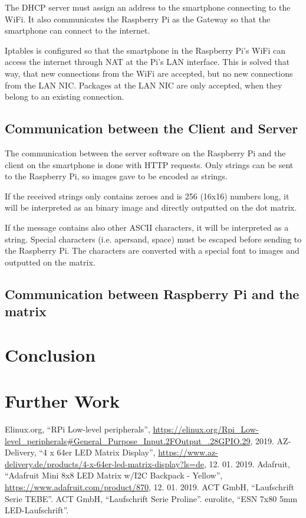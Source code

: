 \documentclass[conference]{IEEEtran}
\begin{document}
The DHCP server must assign an address to the smartphone connecting to the WiFi. It also communicates the Raspberry Pi as the Gateway so that the smartphone can connect to the internet.

Iptables is configured so that the smartphone in the Raspberry Pi's WiFi can access the internet through NAT at the Pi's LAN interface. This is solved that way, that new connections from the WiFi are accepted, but no new connections from the LAN NIC. Packages at the LAN NIC are only accepted, when they belong to an existing connection.

\subsection{Communication between the Client and Server}
The communication between the server software on the Raspberry Pi and the client on the smartphone is done with HTTP requests. Only strings can be sent to the Raspberry Pi, so images gave to be encoded as strings.

If the received strings only contains zeroes and is 256 (16x16) numbers long, it will be interpreted as an binary image and directly outputted on the dot matrix.

If the message contains also other ASCII characters, it will be interpreted as a string. Special characters (i.e. apersand, space) must be escaped before sending to the Raspberry Pi. The characters are converted with a special font to images and outputted on the matrix.

\subsection{Communication between Raspberry Pi and the matrix}



\section{Conclusion}



\section{Further Work}



\begin{thebibliography}{00}
  Elinux.org,
  ``RPi Low-level peripherals'',
  \url{https://elinux.org/Rpi_Low-level_peripherals#General_Purpose_Input.2FOutput_.28GPIO.29},
  2019.
  AZ-Delivery,
  ``4 x 64er LED Matrix Display'',
  \url{https://www.az-delivery.de/products/4-x-64er-led-matrix-display?ls=de},
  12. 01. 2019.
  Adafruit,
  ``Adafruit Mini 8x8 LED Matrix w/I2C Backpack - Yellow'',
  \url{https://www.adafruit.com/product/870},
  12. 01. 2019.
  ACT GmbH,
  ``Laufschrift Serie TEBE''.
  ACT GmbH,
  ``Laufschrift Serie Proline''.
  eurolite,
  ``ESN 7x80 5mm LED-Laufschrift''.
\end{thebibliography}
\end{document}
